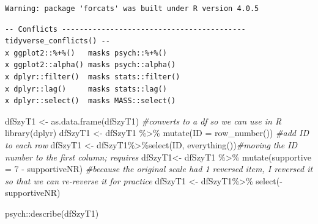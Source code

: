 \documentclass[
  english,
]{book}
\newenvironment{Shaded}{\begin{snugshade}}{\end{snugshade}}
\newcommand{\AttributeTok}[1]{\textcolor[rgb]{0.77,0.63,0.00}{#1}}
\newcommand{\CommentTok}[1]{\textcolor[rgb]{0.56,0.35,0.01}{\textit{#1}}}
\newcommand{\DecValTok}[1]{\textcolor[rgb]{0.00,0.00,0.81}{#1}}
\newcommand{\FunctionTok}[1]{\textcolor[rgb]{0.00,0.00,0.00}{#1}}
\newcommand{\NormalTok}[1]{#1}
\newcommand{\OtherTok}[1]{\textcolor[rgb]{0.56,0.35,0.01}{#1}}
\newcommand{\SpecialCharTok}[1]{\textcolor[rgb]{0.00,0.00,0.00}{#1}}
\begin{document}
\begin{verbatim}
Warning: package 'forcats' was built under R version 4.0.5
\end{verbatim}

\begin{verbatim}
-- Conflicts ------------------------------------------ tidyverse_conflicts() --
x ggplot2::%+%()   masks psych::%+%()
x ggplot2::alpha() masks psych::alpha()
x dplyr::filter()  masks stats::filter()
x dplyr::lag()     masks stats::lag()
x dplyr::select()  masks MASS::select()
\end{verbatim}

\begin{Shaded}
\begin{Highlighting}[]
\NormalTok{dfSzyT1 }\OtherTok{\textless{}{-}} \FunctionTok{as.data.frame}\NormalTok{(dfSzyT1) }\CommentTok{\#converts to a df so we can use in R}
\FunctionTok{library}\NormalTok{(dplyr)}
\NormalTok{dfSzyT1 }\OtherTok{\textless{}{-}}\NormalTok{ dfSzyT1 }\SpecialCharTok{\%\textgreater{}\%} \FunctionTok{mutate}\NormalTok{(}\AttributeTok{ID =} \FunctionTok{row\_number}\NormalTok{()) }\CommentTok{\#add ID to each row}
\NormalTok{dfSzyT1 }\OtherTok{\textless{}{-}}\NormalTok{ dfSzyT1}\SpecialCharTok{\%\textgreater{}\%}\FunctionTok{select}\NormalTok{(ID, }\FunctionTok{everything}\NormalTok{())}\CommentTok{\#moving the ID number to the first column; requires}
\NormalTok{dfSzyT1}\OtherTok{\textless{}{-}}\NormalTok{ dfSzyT1 }\SpecialCharTok{\%\textgreater{}\%}
  \FunctionTok{mutate}\NormalTok{(}\AttributeTok{supportive =} \DecValTok{7} \SpecialCharTok{{-}}\NormalTok{ supportiveNR) }\CommentTok{\#because the original scale had 1 reversed item, I reversed it so that we can re{-}reverse it for practice}
\NormalTok{dfSzyT1 }\OtherTok{\textless{}{-}}\NormalTok{ dfSzyT1}\SpecialCharTok{\%\textgreater{}\%}
  \FunctionTok{select}\NormalTok{(}\SpecialCharTok{{-}}\NormalTok{supportiveNR)}
\end{Highlighting}
\end{Shaded}

\begin{Shaded}
\begin{Highlighting}[]
\NormalTok{psych}\SpecialCharTok{::}\FunctionTok{describe}\NormalTok{(dfSzyT1)}
\end{Highlighting}
\end{Shaded}
\end{document}
